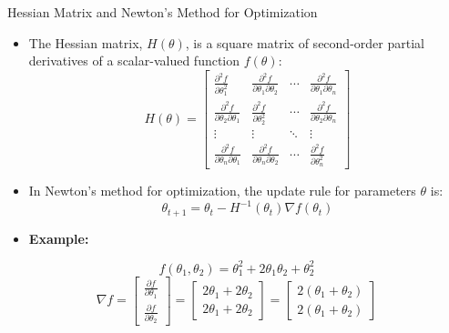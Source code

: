 \documentclass[serif, aspectratio=169]{beamer}
\begin{document}
\begin{frame}{Hessian Matrix and Newton's Method for Optimization}
\begin{minipage}{0.5\linewidth}
    \begin{itemize}
        \item The Hessian matrix, \( H(\theta) \), is a square matrix of second-order partial derivatives of a scalar-valued function \( f(\theta) \):
        \[
        H(\theta) = 
        \begin{bmatrix}
            \frac{\partial^2 f}{\partial \theta_1^2} & \frac{\partial^2 f}{\partial \theta_1 \partial \theta_2} & \cdots & \frac{\partial^2 f}{\partial \theta_1 \partial \theta_n} \\
            \frac{\partial^2 f}{\partial \theta_2 \partial \theta_1} & \frac{\partial^2 f}{\partial \theta_2^2} & \cdots & \frac{\partial^2 f}{\partial \theta_2 \partial \theta_n} \\
            \vdots & \vdots & \ddots & \vdots \\
            \frac{\partial^2 f}{\partial \theta_n \partial \theta_1} & \frac{\partial^2 f}{\partial \theta_n \partial \theta_2} & \cdots & \frac{\partial^2 f}{\partial \theta_n^2}
        \end{bmatrix}
        \]

        \item In Newton's method for optimization, the update rule for parameters \( \theta \) is:
        \[
        \theta_{t+1} = \theta_t - H^{-1}(\theta_t) \nabla f(\theta_t)
        \]
    \end{itemize}
\end{minipage}%
\begin{minipage}{0.5\linewidth}
    \begin{itemize}
    \item \textbf{Example:}
    \end{itemize}
        \[
        f(\theta_1, \theta_2) = \theta_1^2 + 2 \theta_1 \theta_2 + \theta_2^2
        \]
        \[
        \nabla f = 
        \begin{bmatrix}
            \frac{\partial f}{\partial \theta_1} \\
            \frac{\partial f}{\partial \theta_2}
        \end{bmatrix} =
        \begin{bmatrix}
            2\theta_1 + 2\theta_2 \\
            2\theta_1 + 2\theta_2
        \end{bmatrix} =
        \begin{bmatrix}
            2(\theta_1 + \theta_2) \\
            2(\theta_1 + \theta_2)
        \end{bmatrix}
        \]


\end{minipage}
\end{frame}
\end{document}
